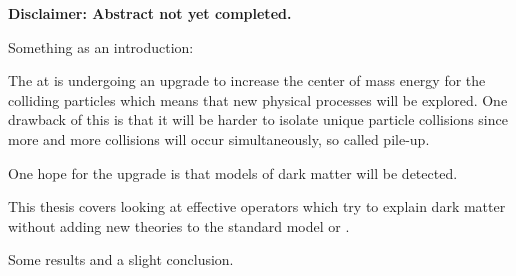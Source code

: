 
\textbf{Disclaimer: Abstract not yet completed.}

Something as an introduction:

The \abbrLHC at \abbrCERN is undergoing an upgrade to increase the center of mass energy for the colliding particles which means that new physical processes will be explored. One drawback of this is that it will be harder to isolate unique particle collisions since more and more collisions will occur simultaneously, so called pile-up. 

One hope for the upgrade is that \abbrWIMP models of dark matter will be detected.

This thesis covers looking at effective operators which try to explain dark matter without adding new theories to the standard model or \abbrQFT . 
 

Some results and a slight conclusion.